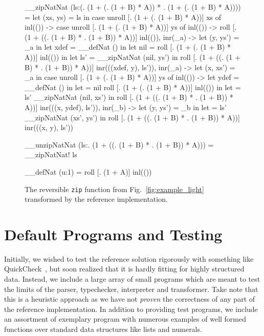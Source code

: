 \begin{figure}[ht!]
  \begin{rfuncode}
__zipNatNat  (ls:(\A . (1 + (\B . (1 + B) * A)) * \A . (1 + (\B . (1 + B) * A)))) =
  let (xs, ys) = ls
  in case unroll [\A . (1 + (\B . (1 + B) * A))] xs of
    inl(()) -> case unroll [\A . (1 + (\B . (1 + B) * A))] ys of
      inl(()) -> roll [\A . (1 + ((\B . (1 + B) * \B . (1 + B)) * A))] inl(()),
      inr(_a) ->
        let (y, ys') = _a
        in let xdef = __defNat ()
        in let nil = roll [\A . (1 + (\B . (1 + B) * A))] inl(())
        in let ls' = __zipNatNat (nil, ys')
        in roll [\A . (1 + ((\B . (1 + B) * \B . (1 + B)) * A))] inr(((xdef, y), ls')),
    inr(_a) ->
      let (x, xs') = _a
      in case unroll [\A . (1 + (\B . (1 + B) * A))] ys of
        inl(()) ->
          let ydef = __defNat  ()
          in let = nil roll [\A . (1 + (\B . (1 + B) * A))] inl(())
          in let = ls' __zipNatNat  (nil, xs')
          in roll [\A . (1 + ((\B . (1 + B) * \B . (1 + B)) * A))] inr(((x, ydef), ls')),
        inr(_b) ->
          let (y, ys') = _b
          in let = ls' __zipNatNat  (xs', ys')
          in roll [\A . (1 + ((\B . (1 + B) * \B . (1 + B)) * A))] inr(((x, y), ls'))

__unzipNatNat  (ls:\A . (1 + ((\B . (1 + B) * \B . (1 + B)) * A))) =
  __zipNatNat!  ls

__defNat  (u:1) = roll [\A . (1 + A)] inl(())
  \end{rfuncode}
  \caption{The reversible \texttt{zip} function from
  Fig.~\ref{fig:example_light} transformed by the reference
  implementation.}\label{fig:example_transformed}
\end{figure}

\section{Default Programs and Testing}

Initially, we wished to test the reference solution rigorously with something
like QuickCheck~\cite{Claessen:2011}, but soon realized that it is hardly
fitting for highly structured data. Instead, we include a large array of small
programs which are meant to test the limits of the parser, typechecker,
interpreter and transformer. Take note that this is a heuristic approach as we
have not \emph{proven} the correctness of any part of the reference
implementation. In addition to providing test programs, we include an
assortment of exemplary program with numerous examples of well formed functions
over standard data structures like lists and numerals.
